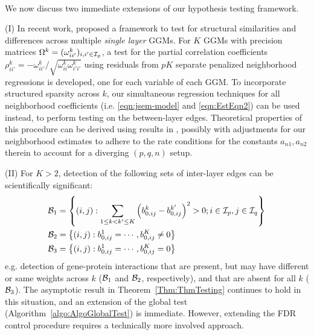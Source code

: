 \paragraph{}
We now discuss two immediate extensions of our hypothesis testing framework.

\vspace{1em}
\noindent (I) In recent work, \cite{Liu17} proposed a framework to test for structural similarities and differences across multiple {\it single layer} GGMs. For $K$ GGMs with precision matrices $\Omega^k = (\omega_{ii'}^k)_{i,i' \in {\cal{I}}_p}$, a test for the partial correlation coefficients $\rho_{ii'}^{k} = - \omega_{ii'}^{k} / \sqrt{\omega_{ii}^{k} \omega_{i'i'}^{k}}$ using residuals from $pK$ separate penalized neighborhood regressions is developed, one for each variable of each GGM. To incorporate structured sparsity across $k$, our simultaneous regression techniques for all neighborhood coefficients (i.e. \eqref{eqn:jsem-model} and \eqref{eqn:EstEqn2}) can be used instead, to perform testing on the between-layer edges. Theoretical properties of this procedure can be derived using results in \cite{Liu17}, possibly with adjustments for our neighborhood estimates to adhere to the rate conditions for the constants $a_{n1}, a_{n2}$ therein to account for a diverging $(p,q,n)$ setup.

\noindent (II) For $K > 2$, detection of the following sets of inter-layer edges can be scientifically significant:
%
\begin{align*}
{\cal{B}}_1 &= \left\{ (i,j): \sum_{1 \leq k < k' \leq K} \left(b_{0,ij}^k - b_{0,ij}^{k'} \right)^2 > 0; i \in {\cal{I}}_p, j \in {\cal{I}}_q \right\}\\
{\cal{B}}_2 &= \left\{ (i,j): b_{0,ij}^1 = \cdots, b_{0,ij}^K \neq 0 \right\}\\
{\cal{B}}_3 &= \left\{ (i,j): b_{0,ij}^1 = \cdots, b_{0,ij}^K = 0 \right\}
\end{align*}
%
e.g. detection of gene-protein interactions that are present, but may have different or same weights across $k$ (${\cal{B}}_1$ and ${\cal{B}}_2$, respectively), and that are absent for all $k$ (${\cal{B}}_3$). The asymptotic result in Theorem~\ref{Thm:ThmTesting} continues to hold in this situation, and an extension of the global test (Algorithm~\ref{algo:AlgoGlobalTest}) is immediate. However, extending the FDR control procedure requires a technically more involved approach.

